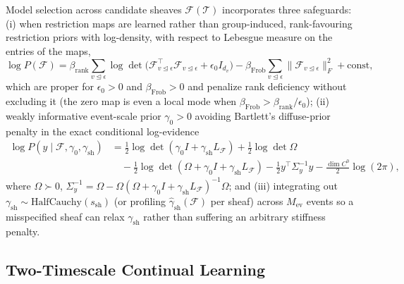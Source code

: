 \documentclass[11pt,a4paper]{article}
\theoremstyle{definition}
\theoremstyle{remark}
\begin{document}
Model selection across candidate sheaves $\mathcal{F}(\mathcal{T})$ incorporates three safeguards: (i) when restriction maps are learned rather than group-induced, rank-favouring restriction priors with log-density, with respect to Lebesgue measure on the entries of the maps,
\begin{equation}
  \log P(\mathcal{F}) = \beta_{\mathrm{rank}} \sum_{v \trianglelefteq \epsilon} \log\det\bigl( \mathcal{F}_{v \trianglelefteq \epsilon}^\top \mathcal{F}_{v \trianglelefteq \epsilon} + \epsilon_0 I_{d_v} \bigr) - \beta_{\mathrm{Frob}} \sum_{v \trianglelefteq \epsilon} \|\mathcal{F}_{v \trianglelefteq \epsilon}\|_F^2 + \mathrm{const},
  \label{eq:sheaf_prior}
\end{equation}
which are proper for $\epsilon_0 > 0$ and $\beta_{\mathrm{Frob}} > 0$ and penalize rank deficiency without excluding it (the zero map is even a local mode when $\beta_{\mathrm{Frob}} > \beta_{\mathrm{rank}}/\epsilon_0$); (ii) weakly informative event-scale prior $\gamma_0 > 0$ avoiding Bartlett's diffuse-prior penalty \cite{lindley1957statistical,bartlett1957comment} in the exact conditional log-evidence
\begin{equation}
  \begin{aligned}
    \log P(y \mid \mathcal{F}, \gamma_0, \gamma_{\mathrm{sh}})
    &= \frac{1}{2} \log\det(\gamma_0 I + \gamma_{\mathrm{sh}} L_{\mathcal{F}}) + \frac{1}{2}\log\det\Omega \\
    &\quad - \frac{1}{2}\log\det(\Omega + \gamma_0 I + \gamma_{\mathrm{sh}} L_{\mathcal{F}}) - \frac{1}{2} y^\top \Sigma_y^{-1} y - \frac{\dim C^0}{2}\log(2\pi),
  \end{aligned}
  \label{eq:log_ev}
\end{equation}
where $\Omega \succ 0$, $\Sigma_y^{-1} = \Omega - \Omega (\Omega + \gamma_0 I + \gamma_{\mathrm{sh}} L_{\mathcal{F}})^{-1} \Omega$; and (iii) integrating out $\gamma_{\mathrm{sh}} \sim \mathrm{HalfCauchy}(s_{\mathrm{sh}})$ (or profiling $\hat{\gamma}_{\mathrm{sh}}(\mathcal{F})$ per sheaf) across $M_{\mathrm{ev}}$ events so a misspecified sheaf can relax $\gamma_{\mathrm{sh}}$ rather than suffering an arbitrary stiffness penalty.

\subsection{Two-Timescale Continual Learning}
\end{document}
